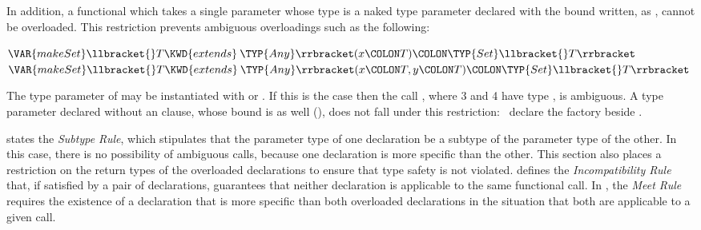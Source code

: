 In addition, a functional which takes a single parameter whose type is
a naked type parameter declared with the bound  written, as
, cannot be
overloaded.  This restriction prevents ambiguous overloadings such as
the following:
\begin{Fortress}
\(\VAR{makeSet}\llbracket{}T \KWD{extends}\mskip 4mu plus 4mu\TYP{Any}\rrbracket(x\COLON T)\COLON \TYP{Set}\llbracket{}T\rrbracket\)\\
\(\VAR{makeSet}\llbracket{}T \KWD{extends}\mskip 4mu plus 4mu\TYP{Any}\rrbracket(x\COLON T, y\COLON T)\COLON \TYP{Set}\llbracket{}T\rrbracket\)
\end{Fortress}
The type parameter of  may be instantiated with
 or .  If this is the
case then the call , where 3 and 4 have type
, is ambiguous.
A type parameter declared without an  clause, whose bound is
 as well (), does not fall under this restriction:
\library\ declare the factory
beside .

 states the \emph{Subtype Rule}, which stipulates
that the parameter type of one declaration be a subtype of the
parameter type of the other.  In this case, there is no possibility of
ambiguous calls, because one declaration is more specific than the
other.  This section also places a restriction on the return types of
the overloaded declarations to ensure that type safety is not
violated.   defines the \emph{
Incompatibility Rule} that, if satisfied by a pair of declarations,
guarantees that neither declaration is applicable to the same
functional call.  In , the \emph{Meet Rule}
requires the existence of a declaration that is more specific than
both overloaded declarations in the situation that both are applicable
to a given call.

